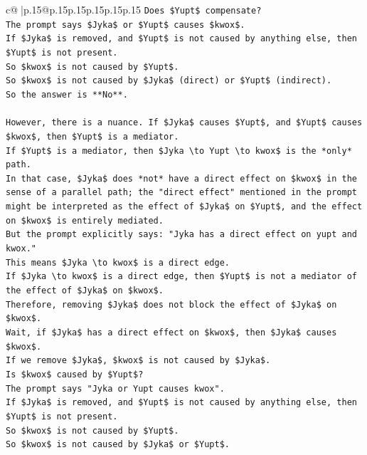 \documentclass{article}
\begin{document}
{\begin{supertabular}{c@{$\;$}|p{.15\linewidth}@{}p{.15\linewidth}p{.15\linewidth}p{.15\linewidth}p{.15\linewidth}p{.15\linewidth}}
{{{\texttt{Does \$Yupt\$ compensate?} \\
\texttt{The prompt says \$Jyka\$ or \$Yupt\$ causes \$kwox\$.} \\
\texttt{If \$Jyka\$ is removed, and \$Yupt\$ is not caused by anything else, then \$Yupt\$ is not present.} \\
\texttt{So \$kwox\$ is not caused by \$Yupt\$.} \\
\texttt{So \$kwox\$ is not caused by \$Jyka\$ (direct) or \$Yupt\$ (indirect).} \\
\texttt{So the answer is **No**.} \\
\\ 
\texttt{However, there is a nuance. If \$Jyka\$ causes \$Yupt\$, and \$Yupt\$ causes \$kwox\$, then \$Yupt\$ is a mediator.} \\
\texttt{If \$Yupt\$ is a mediator, then \$Jyka \textbackslash{}to Yupt \textbackslash{}to kwox\$ is the *only* path.} \\
\texttt{In that case, \$Jyka\$ does *not* have a direct effect on \$kwox\$ in the sense of a parallel path; the "direct effect" mentioned in the prompt might be interpreted as the effect of \$Jyka\$ on \$Yupt\$, and the effect on \$kwox\$ is entirely mediated.} \\
\texttt{But the prompt explicitly says: "Jyka has a direct effect on yupt and kwox."} \\
\texttt{This means \$Jyka \textbackslash{}to kwox\$ is a direct edge.} \\
\texttt{If \$Jyka \textbackslash{}to kwox\$ is a direct edge, then \$Yupt\$ is not a mediator of the effect of \$Jyka\$ on \$kwox\$.} \\
\texttt{Therefore, removing \$Jyka\$ does not block the effect of \$Jyka\$ on \$kwox\$.} \\
\texttt{Wait, if \$Jyka\$ has a direct effect on \$kwox\$, then \$Jyka\$ causes \$kwox\$.} \\
\texttt{If we remove \$Jyka\$, \$kwox\$ is not caused by \$Jyka\$.} \\
\texttt{Is \$kwox\$ caused by \$Yupt\$?} \\
\texttt{The prompt says "Jyka or Yupt causes kwox".} \\
\texttt{If \$Jyka\$ is removed, and \$Yupt\$ is not caused by anything else, then \$Yupt\$ is not present.} \\
\texttt{So \$kwox\$ is not caused by \$Yupt\$.} \\
\texttt{So \$kwox\$ is not caused by \$Jyka\$ or \$Yupt\$.} \\
}}}
\end{supertabular}}
\end{document}
